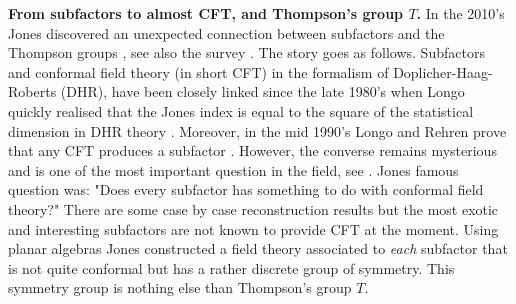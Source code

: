 \documentclass[a4paper, 12pt]{amsart}
\numberwithin{equation}{section}
\theoremstyle{definition}
\begin{document}
{\bf From subfactors to almost CFT, and Thompson's group $T$.}
In the 2010's Jones discovered an unexpected connection between subfactors and the Thompson groups \cite{Jones17}, see also the survey \cite{Brothier20-survey}.
The story goes as follows.
Subfactors and conformal field theory (in short CFT) in the formalism of Doplicher-Haag-Roberts (DHR), have been closely linked since the late 1980's when Longo quickly realised that the Jones index is equal to the square of the statistical dimension in DHR theory \cite{Doplicher-Haag-Roberts71, Longo89}. 
Moreover, in the mid 1990's Longo and Rehren prove that any CFT produces a subfactor \cite{Longo-Rehren95}.
However, the converse remains mysterious and is one of the most important question in the field, see  \cite{Evans-Gannon11, Bischoff17, Xu18}.
Jones famous question was: "Does every subfactor has something to do with conformal field theory?"
There are some case by case reconstruction results but the most exotic and interesting subfactors are not known to provide CFT at the moment.
Using planar algebras Jones constructed a field theory associated to {\it each} subfactor that is not quite conformal but has a rather discrete group of symmetry.
This symmetry group is nothing else than Thompson's group $T$. 
\end{document}

